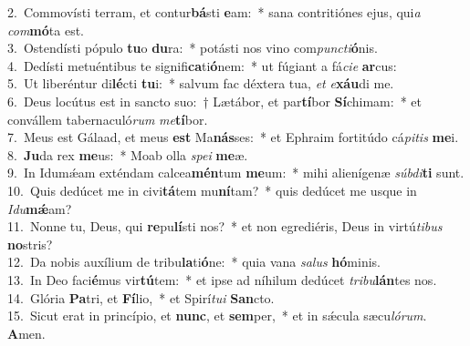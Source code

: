 {2.~}Commovísti terram, et contur\textbf{bá}sti \textbf{e}am:~* sana contritiónes ejus, qui\textit{a} \textit{com}\textbf{mó}ta est.\\
{3.~}Ostendísti pópulo \textbf{tu}o \textbf{du}ra:~* potásti nos vino com\textit{pun}\textit{cti}\textbf{ó}nis.\\
{4.~}Dedísti metuéntibus te signifi\textbf{ca}ti\textbf{ó}nem:~* ut fúgiant a fá\textit{ci}\textit{e} \textbf{ar}cus:\\
{5.~}Ut liberéntur di\textbf{lé}cti \textbf{tu}i:~* salvum fac déxtera tua, \textit{et} \textit{e}\textbf{xáu}di me.\\
{6.~}Deus locútus est in sancto suo:~† Lætábor, et par\textbf{tí}bor \textbf{Sí}chimam:~* et convállem tabernaculó\textit{rum} \textit{me}\textbf{tí}bor.\\
{7.~}Meus est Gálaad, et meus \textbf{est} Ma\textbf{nás}ses:~* et Ephraim fortitúdo cá\textit{pi}\textit{tis} \textbf{me}i.\\
{8.~}\textbf{Ju}da rex \textbf{me}us:~* Moab olla \textit{spe}\textit{i} \textbf{me}æ.\\
{9.~}In Idumǽam exténdam calcea\textbf{mén}tum \textbf{me}um:~* mihi alienígenæ \textit{súb}\textit{di}\textbf{ti} sunt.\\
{10.~}Quis dedúcet me in civi\textbf{tá}tem mu\textbf{ní}tam?~* quis dedúcet me usque in \textit{I}\textit{du}\textbf{mǽ}am?\\
{11.~}Nonne tu, Deus, qui \textbf{re}pu\textbf{lí}sti nos?~* et non egrediéris, Deus in virtú\textit{ti}\textit{bus} \textbf{no}stris?\\
{12.~}Da nobis auxílium de tribu\textbf{la}ti\textbf{ó}ne:~* quia vana \textit{sa}\textit{lus} \textbf{hó}minis.\\
{13.~}In Deo faci\textbf{é}mus vir\textbf{tú}tem:~* et ipse ad níhilum dedúcet \textit{tri}\textit{bu}\textbf{lán}tes nos.\\
{14.~}Glória \textbf{Pa}tri, et \textbf{Fí}lio,~* et Spirí\textit{tu}\textit{i} \textbf{San}cto.\\
{15.~}Sicut erat in princípio, et \textbf{nunc}, et \textbf{sem}per,~* et in sǽcula sæcu\textit{ló}\textit{rum}. \textbf{A}men.\\
